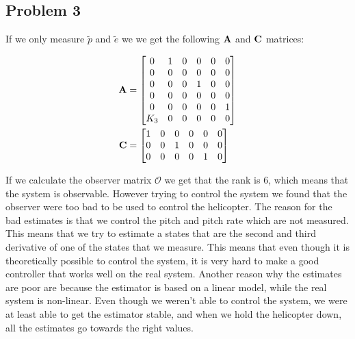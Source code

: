 \subsection{Problem 3}
If we only measure $\tilde p$ and $\tilde e$ we we get the following $\mathbf{A}$ and $\mathbf{C}$ matrices:

\begin{subequations}
	\begin{align}
		\mathbf{A} &= \begin{bmatrix}
			0 & 1 & 0 & 0 & 0 & 0\\
			0 & 0 & 0 & 0 & 0 & 0\\
			0 & 0 & 0 & 1 & 0 & 0\\
			0 & 0 & 0 & 0 & 0 & 0\\
			0 & 0 & 0 & 0 & 0 & 1\\
			K_3 & 0 & 0 & 0 & 0 & 0
		\end{bmatrix}\\
		\mathbf{C} &= \begin{bmatrix}
			1 & 0 & 0 & 0 & 0 & 0\\
			0 & 0 & 1 & 0 & 0 & 0\\
			0 & 0 & 0 & 0 & 1 & 0
		\end{bmatrix}
	\end{align}
\end{subequations}

If we calculate the observer matrix $\mathcal{O}$ we get that the rank is 6, which means that the system is observable. However trying to control the system we found that the observer were too bad to be used to control the helicopter. The reason for the bad estimates is that we control the pitch and pitch rate which are not measured. This means that we try to estimate a states that are the second and third derivative of one of the states that we measure. This means that even though it is theoretically possible to control the system, it is very hard to make a good controller that works well on the real system. Another reason why the estimates are poor are because the estimator is based on a linear model, while the real system is non-linear. Even though we weren't able to control the system, we were at least able to get the estimator stable, and when we hold the helicopter down, all the estimates go towards the right values.